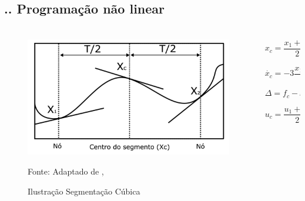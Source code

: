 \documentclass[aspectratio=169]{beamer}
\begin{document}
\subsection{\insertsectionnumber .\insertsubsectionnumber . Programação não linear}

\begin{frame}
  \frametitle{\insertsubsection}

  \begin{columns}
    \begin{column}{.6\textwidth}
      \begin{figure}[H]
        \centering
        \caption{Ilustração Segmentação Cúbica}
        \includegraphics[width=1\textwidth]{hargraves_func}
    
        {\footnotesize Fonte: Adaptado de \citeauthor{hargraves87}, \citeyear{hargraves87}}
        \label{fig:hargraves_fun}
      \end{figure}
    \end{column}
    \begin{column}{.45\textwidth}
      \begin{equation}
        \label{eq:state_center_segment}
        x_c = \frac{x_{1} + x_{2}}{2} + T\frac{f_{1} - f_{2}}{8}
      \end{equation}
    
      \begin{equation}
        \label{eq:state_dot_center_segment}
        \dot{x_{c}} = -3\frac{x_{1} + x_{2}}{2T} + \frac{f_{1} + f_{2}}{4}
      \end{equation}
    
      \begin{equation}
        \label{eq:defect_calc}
        \Delta = f_c - \dot{x_c}
      \end{equation}
    
      \begin{equation}
        \label{eq:input_value_center_segment}
        u_c = \frac{u_1 + u_2}{2}
      \end{equation}
    \end{column}
  \end{columns}
\end{frame}
\end{document}
